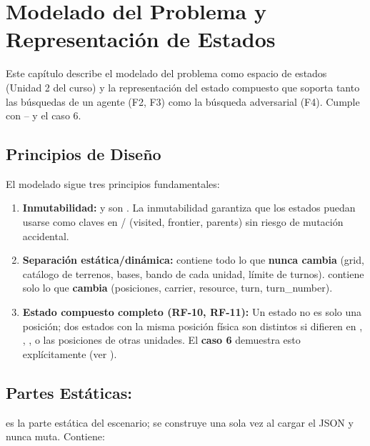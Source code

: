 \chapter{Modelado del Problema y Representación de Estados}
\label{ch:modelado}

Este capítulo describe el modelado del problema como espacio de estados (Unidad 2 del curso) y
la representación del estado compuesto que soporta tanto las búsquedas de un agente (F2, F3)
como la búsqueda adversarial (F4). Cumple con -- y el caso 6.

\section{Principios de Diseño}
\label{sec:principios-diseno}

El modelado sigue tres principios fundamentales:

\begin{enumerate}
\item \textbf{Inmutabilidad:}  y  son .
    La inmutabilidad garantiza que los estados puedan usarse como claves en /
    (visited, frontier, parents) sin riesgo de mutación accidental.
\item \textbf{Separación estática/dinámica:}  contiene todo lo que \textbf{nunca
    cambia} (grid, catálogo de terrenos, bases, bando de cada unidad, límite de turnos).
     contiene solo lo que \textbf{cambia} (posiciones, carrier, resource, turn,
    turn\_number).
\item \textbf{Estado compuesto completo (RF-10, RF-11):} Un estado no es solo una posición;
    dos estados con la misma posición física son distintos si difieren en ,
    , ,  o las posiciones de otras unidades.
    El     \textbf{caso 6} demuestra esto explícitamente (ver ).
\end{enumerate}

\section{Partes Estáticas: }
\label{sec:board}

 es la parte estática del escenario; se construye una sola vez al cargar el JSON y
nunca muta. Contiene:

